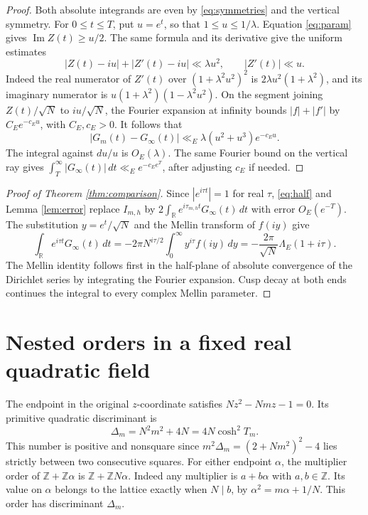 \documentclass[11pt]{article}
\newcommand{\Z}{\mathbb Z}
\newcommand{\R}{\mathbb R}
\begin{document}
\begin{proof}
Both absolute integrands are even by \eqref{eq:symmetries} and the vertical
symmetry. For \(0\le t\le T\), put \(u=e^t\), so that \(1\le u\le1/\lambda\).
Equation \eqref{eq:param} gives \(\operatorname{Im}Z(t)\ge u/2\). The same
formula and its derivative give the uniform estimates
\[
 |Z(t)-iu|+|Z'(t)-iu|\ll \lambda u^2,\qquad |Z'(t)|\ll u.
\]
Indeed the real numerator of \(Z'(t)\) over
\((1+\lambda^2u^2)^2\) is \(2\lambda u^2(1+\lambda^2)\), and its
imaginary numerator is
\(u(1+\lambda^2)(1-\lambda^2u^2)\).
On the segment joining \(Z(t)/\sqrt N\) to \(iu/\sqrt N\), the Fourier
expansion at infinity bounds \(|f|+|f'|\) by \(C_Ee^{-c_Eu}\), with
\(C_E,c_E>0\). It follows that
\[
 |G_m(t)-G_\infty(t)|\ll_E
 \lambda(u^2+u^3)e^{-c_Eu}.
\]
The integral against \(du/u\) is \(O_E(\lambda)\). The same Fourier bound
on the vertical ray gives
\(\int_T^\infty|G_\infty(t)|\,dt\ll_E e^{-c_E e^T}\), after adjusting
\(c_E\) if needed.
\end{proof}

\begin{proof}[Proof of Theorem \ref{thm:comparison}]
Since \(|e^{i\tau t}|=1\) for real \(\tau\), \eqref{eq:half} and
Lemma \ref{lem:error} replace \(I_{m,h}\) by
\(2\int_\R e^{i\tau_{m,h}t}G_\infty(t)\,dt\) with error \(O_E(e^{-T})\).
The substitution \(y=e^t/\sqrt N\) and the Mellin transform of \(f(iy)\)
give
\[
 \int_\R e^{i\tau t}G_\infty(t)\,dt
  =-2\pi N^{i\tau/2}\int_0^\infty y^{i\tau}f(iy)\,dy
  =-\frac{2\pi}{\sqrt N}\Lambda_E(1+i\tau).
\]
The Mellin identity follows first in the half-plane of absolute convergence
of the Dirichlet series by integrating the Fourier expansion. Cusp decay at
both ends continues the integral to every complex Mellin parameter.
\end{proof}

\section{Nested orders in a fixed real quadratic field}

The endpoint in the original \(z\)-coordinate satisfies
\(Nz^2-Nmz-1=0\). Its primitive quadratic discriminant is
\begin{equation}
 \Delta_m=N^2m^2+4N=4N\cosh^2 T_m.
 \label{eq:disc}
\end{equation}
This number is positive and nonsquare since \(m^2\Delta_m=(2+Nm^2)^2-4\) lies strictly
between two consecutive squares. For either endpoint \(\alpha\), the
multiplier order of \(\Z+\Z\alpha\) is \(\Z+\Z N\alpha\).
Indeed any multiplier is \(a+b\alpha\) with \(a,b\in\Z\). Its value on
\(\alpha\) belongs to the lattice exactly when \(N\mid b\), by
\(\alpha^2=m\alpha+1/N\). This order has discriminant \(\Delta_m\).
\end{document}
